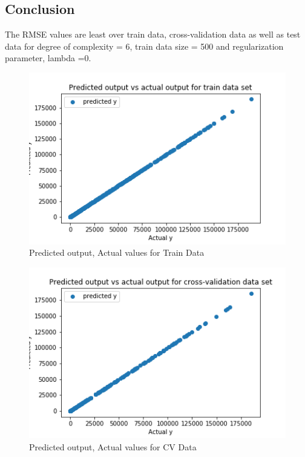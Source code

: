 \documentclass[12pt,a4paper]{article}
\begin{document}
\subsection{Conclusion}
 
 The RMSE values are least over train data, cross-validation data as well as test data for degree of complexity = 6, train data size = 500 and regularization parameter, lambda =0.
 
\begin{figure}[H]
     \centering
     \includegraphics[scale=0.7]{images/predgoodtrain.png}
     \caption{Predicted output, Actual values for Train Data}
     \label{fig:d6500}
\end{figure}
 
\begin{figure}[H]
     \centering
     \includegraphics[scale=0.7]{images/predcv.png}
     \caption{Predicted output, Actual values for CV Data}
     \label{fig:d6500}
\end{figure}
 
\end{document}
